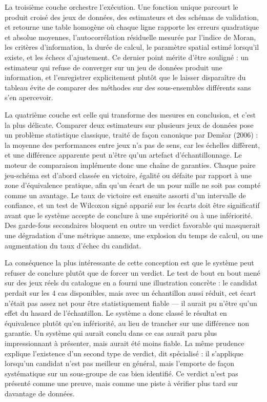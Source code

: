 \documentclass[11pt,a4paper]{article}
\begin{document}
La troisième couche orchestre l'exécution. Une fonction unique parcourt le produit croisé des jeux de données, des estimateurs et des schémas de validation, et retourne une table homogène où chaque ligne rapporte les erreurs quadratique et absolue moyennes, l'autocorrélation résiduelle mesurée par l'indice de Moran, les critères d'information, la durée de calcul, le paramètre spatial estimé lorsqu'il existe, et les échecs d'ajustement. Ce dernier point mérite d'être souligné : un estimateur qui refuse de converger sur un jeu de données produit une information, et l'enregistrer explicitement plutôt que le laisser disparaître du tableau évite de comparer des méthodes sur des sous-ensembles différents sans s'en apercevoir.

La quatrième couche est celle qui transforme des mesures en conclusion, et c'est la plus délicate. Comparer deux estimateurs sur plusieurs jeux de données pose un problème statistique classique, traité de façon canonique par Demšar (2006) : la moyenne des performances entre jeux n'a pas de sens, car les échelles diffèrent, et une différence apparente peut n'être qu'un artefact d'échantillonnage. Le moteur de comparaison implémente donc une chaîne de garanties. Chaque paire jeu-schéma est d'abord classée en victoire, égalité ou défaite par rapport à une zone d'équivalence pratique, afin qu'un écart de un pour mille ne soit pas compté comme un avantage. Le taux de victoire est ensuite assorti d'un intervalle de confiance, et un test de Wilcoxon signé apparié sur les écarts doit être significatif avant que le système accepte de conclure à une supériorité ou à une infériorité. Des garde-fous secondaires bloquent en outre un verdict favorable qui masquerait une dégradation d'une métrique annexe, une explosion du temps de calcul, ou une augmentation du taux d'échec du candidat.

La conséquence la plus intéressante de cette conception est que le système peut refuser de conclure plutôt que de forcer un verdict. Le test de bout en bout mené sur des jeux réels du catalogue en a fourni une illustration concrète : le candidat perdait sur les 4 cas disponibles, mais avec un échantillon aussi réduit, cet écart n'était pas assez net pour être statistiquement fiable — il aurait pu n'être qu'un effet du hasard de l'échantillon. Le système a donc classé le résultat en équivalence plutôt qu'en infériorité, au lieu de trancher sur une différence non garantie. Un système qui aurait conclu dans ce cas aurait paru plus impressionnant à présenter, mais aurait été moins fiable. La même prudence explique l'existence d'un second type de verdict, dit spécialisé : il s'applique lorsqu'un candidat n'est pas meilleur en général, mais l'emporte de façon systématique sur un sous-groupe de cas bien identifié. Ce verdict n'est pas présenté comme une preuve, mais comme une piste à vérifier plus tard sur davantage de données.
\end{document}
